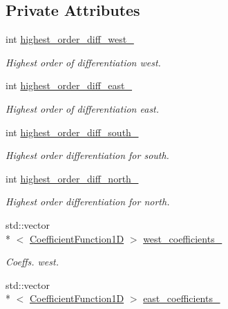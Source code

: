 \subsection*{Private Attributes}
\begin{DoxyCompactItemize}
\item 
int \hyperlink{classmtk_1_1RobinBCDescriptor2D_a5d4d25e65ae74dbde678270933e2fa84}{highest\+\_\+order\+\_\+diff\+\_\+west\+\_\+}
\begin{DoxyCompactList}\small\item\em Highest order of differentiation west. \end{DoxyCompactList}\item 
int \hyperlink{classmtk_1_1RobinBCDescriptor2D_aedb5c01c28158beb1689e1d70e10d8e5}{highest\+\_\+order\+\_\+diff\+\_\+east\+\_\+}
\begin{DoxyCompactList}\small\item\em Highest order of differentiation east. \end{DoxyCompactList}\item 
int \hyperlink{classmtk_1_1RobinBCDescriptor2D_a9a408620e32bcdbd80fa83a0d1063872}{highest\+\_\+order\+\_\+diff\+\_\+south\+\_\+}
\begin{DoxyCompactList}\small\item\em Highest order differentiation for south. \end{DoxyCompactList}\item 
int \hyperlink{classmtk_1_1RobinBCDescriptor2D_a7c715341c17da7e75fd8b3e54e2417c5}{highest\+\_\+order\+\_\+diff\+\_\+north\+\_\+}
\begin{DoxyCompactList}\small\item\em Highest order differentiation for north. \end{DoxyCompactList}\item 
std\+::vector\\*
$<$ \hyperlink{group__c07-mim__ops_gaa79593eeb6676d6011db339e01983909}{Coefficient\+Function1\+D} $>$ \hyperlink{classmtk_1_1RobinBCDescriptor2D_a1f341dc6485b78acf5408d22c87a6dd1}{west\+\_\+coefficients\+\_\+}
\begin{DoxyCompactList}\small\item\em Coeffs. west. \end{DoxyCompactList}\item 
std\+::vector\\*
$<$ \hyperlink{group__c07-mim__ops_gaa79593eeb6676d6011db339e01983909}{Coefficient\+Function1\+D} $>$ \hyperlink{classmtk_1_1RobinBCDescriptor2D_aacf640e8d310f53fc9b0a10b66e04ab6}{east\+\_\+coefficients\+\_\+}

\end{DoxyCompactItemize}
